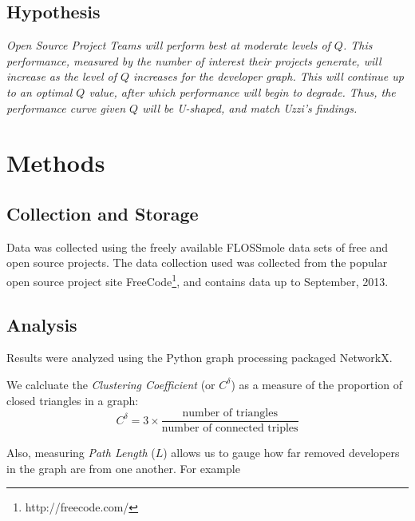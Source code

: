 \documentclass{proc}
\begin{document}
\subsection{Hypothesis}

\textit{Open Source Project Teams will perform best at moderate levels of $Q$. This performance, measured by the number of interest their projects generate, will increase as the level of $Q$ increases for the developer graph. This will continue up to an optimal $Q$ value, after which performance will begin to degrade. Thus, the performance curve given $Q$ will be U-shaped, and match Uzzi's findings\cite{uzzi2005collaboration}. }

\section{Methods}

\subsection{Collection and Storage}
Data was collected using the freely available FLOSSmole\cite{floss2006} data sets of free and open source projects. The data collection used was collected from the popular open source project site FreeCode\footnote{http://freecode.com/}, and contains data up to September, 2013.

\subsection{Analysis}
Results were analyzed using the Python graph processing packaged NetworkX\cite{hagberg-2008-exploring}.

We calcluate the \textit{Clustering Coefficient} (or $C^\delta$) as a measure of the proportion of closed triangles in a graph\cite{newman2003structure}:
\[C^\delta = 3 \times \frac{\text{number of triangles}}
                    {\text{number of connected triples}}\]

Also, measuring \textit{Path Length} ($L$) allows us to gauge how far removed developers in the graph are from one another. For example 

\end{document}

